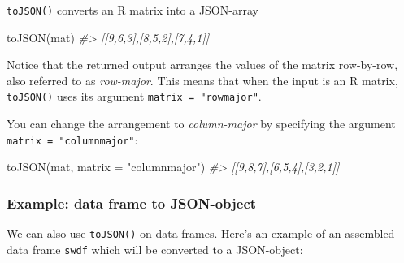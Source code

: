 \documentclass[
]{book}
\newenvironment{Shaded}{\begin{snugshade}}{\end{snugshade}}
\newcommand{\AttributeTok}[1]{\textcolor[rgb]{0.77,0.63,0.00}{#1}}
\newcommand{\CommentTok}[1]{\textcolor[rgb]{0.56,0.35,0.01}{\textit{#1}}}
\newcommand{\FunctionTok}[1]{\textcolor[rgb]{0.00,0.00,0.00}{#1}}
\newcommand{\NormalTok}[1]{#1}
\newcommand{\StringTok}[1]{\textcolor[rgb]{0.31,0.60,0.02}{#1}}
\begin{document}
\texttt{toJSON()} converts an R matrix into a JSON-array

\begin{Shaded}
\begin{Highlighting}[]
\FunctionTok{toJSON}\NormalTok{(mat)}
\CommentTok{\#\textgreater{} [[9,6,3],[8,5,2],[7,4,1]]}
\end{Highlighting}
\end{Shaded}

Notice that the returned output arranges the values of the matrix row-by-row,
also referred to as \emph{row-major}. This means that when the input is an R matrix,
\texttt{toJSON()} uses its argument \texttt{matrix\ =\ "rowmajor"}.

You can change the arrangement to \emph{column-major} by specifying the argument
\texttt{matrix\ =\ "columnmajor"}:

\begin{Shaded}
\begin{Highlighting}[]
\FunctionTok{toJSON}\NormalTok{(mat, }\AttributeTok{matrix =} \StringTok{"columnmajor"}\NormalTok{)}
\CommentTok{\#\textgreater{} [[9,8,7],[6,5,4],[3,2,1]]}
\end{Highlighting}
\end{Shaded}

\hypertarget{example-data-frame-to-json-object}{%
\subsubsection*{Example: data frame to JSON-object}\label{example-data-frame-to-json-object}}

We can also use \texttt{toJSON()} on data frames. Here's an example of an assembled
data frame \texttt{swdf} which will be converted to a JSON-object:
\end{document}
